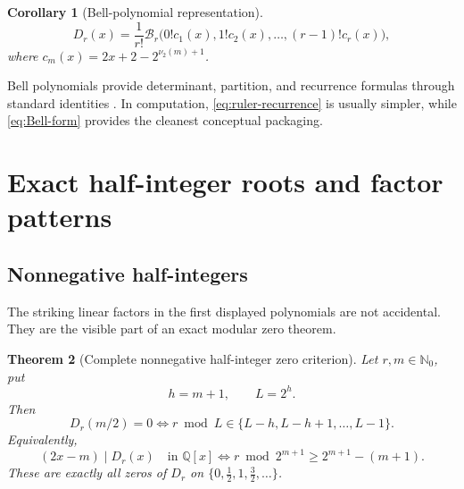 \documentclass[11pt,oneside]{article}
\numberwithin{equation}{section}
\newtheorem{theorem}{Theorem}[section]
\newtheorem{corollary}[theorem]{Corollary}
\theoremstyle{definition}
\theoremstyle{remark}
\newcommand{\Nzero}{\mathbb N_0}
\newcommand{\Q}{\mathbb Q}
\newcommand{\nuTwo}{\nu_2}
\newcommand{\Diag}{D}
\newcommand{\Bell}{\mathcal B}
\begin{document}
\begin{corollary}[Bell-polynomial representation]
\begin{equation}
 \boxed{
 \Diag_r(x)=\frac1{r!}
 \Bell_r\bigl(0!c_1(x),1!c_2(x),\ldots,(r-1)!c_r(x)\bigr),}
 \label{eq:Bell-form}
\end{equation}
where \(c_m(x)=2x+2-2^{\nuTwo(m)+1}\).
\end{corollary}

Bell polynomials provide determinant, partition, and recurrence formulas
through standard identities \cite{Comtet1974}.  In computation,
\eqref{eq:ruler-recurrence} is usually simpler, while \eqref{eq:Bell-form}
provides the cleanest conceptual packaging.

\section{Exact half-integer roots and factor patterns}

\subsection{Nonnegative half-integers}

The striking linear factors in the first displayed polynomials are not
accidental.  They are the visible part of an exact modular zero theorem.

\begin{theorem}[Complete nonnegative half-integer zero criterion]
Let \(r,m\in\Nzero\), put
\begin{equation}
 h=m+1,
 \qquad
 L=2^h.
 \label{eq:half-root-hL}
\end{equation}
Then
\begin{equation}
 \boxed{
 \Diag_r(m/2)=0
 \iff
 r\bmod L\in\{L-h,L-h+1,\ldots,L-1\}.}
 \label{eq:half-root-criterion}
\end{equation}
Equivalently,
\begin{equation}
 (2x-m)\mid\Diag_r(x)\quad\text{in }\Q[x]
 \iff
 r\bmod 2^{m+1}\ge2^{m+1}-(m+1).
 \label{eq:factor-criterion}
\end{equation}
These are exactly all zeros of \(\Diag_r\) on
\(\{0,\tfrac12,1,\tfrac32,\ldots\}\).
\end{theorem}
\end{document}
